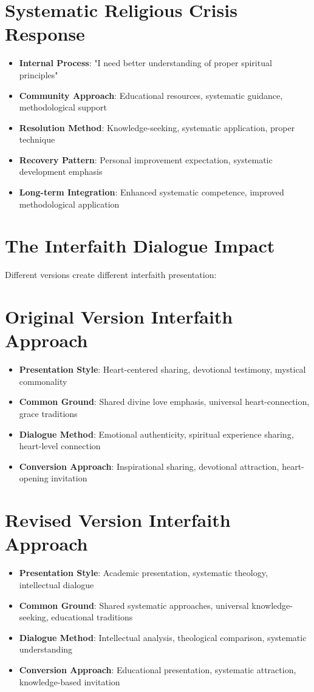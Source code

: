 \documentclass[11pt,twoside]{book}
\begin{document}
\section*{Systematic Religious Crisis Response}
\label{sec:org574197e}
\begin{itemize}
\item \textbf{\textbf{Internal Process}}: "I need better understanding of proper spiritual principles"
\item \textbf{\textbf{Community Approach}}: Educational resources, systematic guidance, methodological support
\item \textbf{\textbf{Resolution Method}}: Knowledge-seeking, systematic application, proper technique
\item \textbf{\textbf{Recovery Pattern}}: Personal improvement expectation, systematic development emphasis
\item \textbf{\textbf{Long-term Integration}}: Enhanced systematic competence, improved methodological application
\end{itemize}
\section*{The Interfaith Dialogue Impact}
\label{sec:orgaa8ea88}

Different versions create different interfaith presentation:
\section*{Original Version Interfaith Approach}
\label{sec:orgb491dd1}
\begin{itemize}
\item \textbf{\textbf{Presentation Style}}: Heart-centered sharing, devotional testimony, mystical commonality
\item \textbf{\textbf{Common Ground}}: Shared divine love emphasis, universal heart-connection, grace traditions
\item \textbf{\textbf{Dialogue Method}}: Emotional authenticity, spiritual experience sharing, heart-level connection
\item \textbf{\textbf{Conversion Approach}}: Inspirational sharing, devotional attraction, heart-opening invitation
\end{itemize}
\section*{Revised Version Interfaith Approach}
\label{sec:orgeb4fc83}
\begin{itemize}
\item \textbf{\textbf{Presentation Style}}: Academic presentation, systematic theology, intellectual dialogue
\item \textbf{\textbf{Common Ground}}: Shared systematic approaches, universal knowledge-seeking, educational traditions
\item \textbf{\textbf{Dialogue Method}}: Intellectual analysis, theological comparison, systematic understanding
\item \textbf{\textbf{Conversion Approach}}: Educational presentation, systematic attraction, knowledge-based invitation
\end{itemize}
\end{document}
